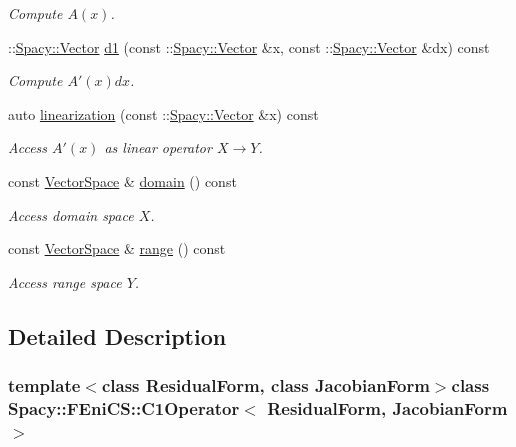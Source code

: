 \begin{DoxyCompactItemize}
\begin{DoxyCompactList}\small\item\em Compute $A(x)$. \end{DoxyCompactList}\item 
\+::\hyperlink{classSpacy_1_1Vector}{Spacy\+::\+Vector} \hyperlink{classSpacy_1_1FEniCS_1_1C1Operator_a610d7a4a5daec3b512ab3ccf46a7b9e9_a610d7a4a5daec3b512ab3ccf46a7b9e9}{d1} (const \+::\hyperlink{classSpacy_1_1Vector}{Spacy\+::\+Vector} \&x, const \+::\hyperlink{classSpacy_1_1Vector}{Spacy\+::\+Vector} \&dx) const 
\begin{DoxyCompactList}\small\item\em Compute $A'(x)dx$. \end{DoxyCompactList}\item 
auto \hyperlink{classSpacy_1_1FEniCS_1_1C1Operator_aab603c2b35f2b710b2e646cf3fb7ee9c_aab603c2b35f2b710b2e646cf3fb7ee9c}{linearization} (const \+::\hyperlink{classSpacy_1_1Vector}{Spacy\+::\+Vector} \&x) const 
\begin{DoxyCompactList}\small\item\em Access $A'(x)$ as linear operator $X\rightarrow Y$. \end{DoxyCompactList}\item 
const \hyperlink{classSpacy_1_1VectorSpace}{Vector\+Space} \& \hyperlink{classSpacy_1_1OperatorBase_a2588f9b3e0188820c4c494e63293dc6f_a2588f9b3e0188820c4c494e63293dc6f}{domain} () const 
\begin{DoxyCompactList}\small\item\em Access domain space $X$. \end{DoxyCompactList}\item 
const \hyperlink{classSpacy_1_1VectorSpace}{Vector\+Space} \& \hyperlink{classSpacy_1_1OperatorBase_ab19d3b7a6f290b1079248f1e567e53d6_ab19d3b7a6f290b1079248f1e567e53d6}{range} () const 
\begin{DoxyCompactList}\small\item\em Access range space $Y$. \end{DoxyCompactList}\end{DoxyCompactItemize}


\subsection{Detailed Description}
\subsubsection*{template$<$class Residual\+Form, class Jacobian\+Form$>$class Spacy\+::\+F\+Eni\+C\+S\+::\+C1\+Operator$<$ Residual\+Form, Jacobian\+Form $>$}

